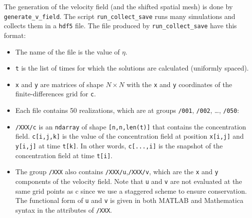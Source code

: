 \documentclass{article}
\newcommand{\0}{^{(0)}}
\begin{document}
The generation of the velocity field (and the shifted spatial mesh) is done by \verb|generate_v_field|. The script \verb|run_collect_save| runs many simulations and collects them in a \verb|hdf5| file. 
The file produced by \texttt{run\_collect\_save} have this format: 

\begin{itemize}
	\item The name of the file is the value of $\eta$.
	\item \verb|t| is the list of times for which the solutions are calculated	(uniformly spaced).
	\item \verb|x| and \verb|y| are matrices of shape $N\times N$ with the \texttt{x} and \texttt{y} coordinates of the	finite-differences grid for \verb|c|.
	\item Each file contains 50 realizations, which are at groups \texttt{/001},
	\texttt{/002}, \ldots{}, \texttt{/050}: 
	\item \texttt{/XXX/c} is an
	\texttt{ndarray} of shape \texttt{[n,n,len(t)]} that contains the
	concentration field. \texttt{c[i,j,k]} is the value of the
	concentration field at position \texttt{x[i,j]} and
	\texttt{y[i,j]} at time \texttt{t[k]}. In other words,
	\texttt{c[...,i]} is the snapshot of the concentration field at time
	\texttt{t[i]}. 
	\item The group \texttt{/XXX} also contains
	\texttt{/XXX/u},\texttt{/XXX/v}, which are the \texttt{x} and \texttt{y}
	components of the velocity field. Note that \texttt{u} and \texttt{v}
	are not evaluated at the same grid points as c since we use a staggered
	scheme to ensure conservation. The functional form of \texttt{u} and
	\texttt{v} is given in both MATLAB and Mathematica syntax in the
	attributes of \texttt{/XXX}.
\end{itemize} 
\end{document}
